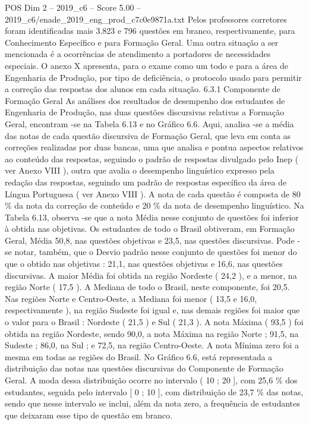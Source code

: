 \begin{textsample}{POS Dim 2 – 2019\_c6 – Score 5.00 – 2019\_c6/enade\_2019\_eng\_prod\_c7c0e9871a.txt}
Pelos professores corretores foram identificadas mais 3.823 e 796 questões em branco, respectivamente, para Conhecimento Específico e para Formação Geral.
Uma outra situação a ser mencionada é a ocorrências de atendimento a portadores de necessidades especiais.
O anexo X apresenta, para o exame como um todo e para a área de Engenharia de Produção, por tipo de deficiência, o protocolo usado para permitir a correção das respostas dos alunos em cada situação. 6.3.1 Componente de Formação Geral As análises dos resultados de desempenho dos estudantes de Engenharia de Produção, nas duas questões discursivas relativas a Formação Geral, encontram -se na Tabela 6.13 e no Gráfico 6.6.
Aqui, analisa -se a média das notas de cada questão discursiva de Formação Geral, que leva em conta as correções realizadas por duas bancas, uma que analisa e pontua aspectos relativos ao conteúdo das respostas, seguindo o padrão de respostas divulgado pelo Inep ( ver Anexo VIII ), outra que avalia o desempenho linguístico expresso pela redação das respostas, seguindo um padrão de respostas específico da área de Língua Portuguesa ( ver Anexo VIII ).
A nota de cada questão é composta de 80 \% da nota da correção de conteúdo e 20 \% da nota de desempenho linguístico.
Na Tabela 6.13, observa -se que a nota Média nesse conjunto de questões foi inferior à obtida nas objetivas.
Os estudantes de todo o Brasil obtiveram, em Formação Geral, Média 50,8, nas questões objetivas e 23,5, nas questões discursivas.
Pode -se notar, também, que o Desvio padrão nesse conjunto de questões foi menor do que o obtido nas objetivas : 21,1, nas questões objetivas e 16,6, nas questões discursivas.
A maior Média foi obtida na região Nordeste ( 24,2 ), e a menor, na região Norte ( 17,5 ).
A Mediana de todo o Brasil, neste componente, foi 20,5.
Nas regiões Norte e Centro-Oeste, a Mediana foi menor ( 13,5 e 16,0, respectivamente ), na região Sudeste foi igual e, nas demais regiões foi maior que o valor para o Brasil : Nordeste ( 21,5 ) e Sul ( 21,3 ).
A nota Máxima ( 93,5 ) foi obtida na região Nordeste, sendo 90,0, a nota Máxima na região Norte ; 91,5, na Sudeste ; 86,0, na Sul ; e 72,5, na região Centro-Oeste.
A nota Mínima zero foi a mesma em todas as regiões do Brasil.
No Gráfico 6.6, está representada a distribuição das notas nas questões discursivas do Componente de Formação Geral.
A moda dessa distribuição ocorre no intervalo ( 10 ; 20 ], com 25,6 \% dos estudantes, seguida pelo intervalo [ 0 ; 10 ], com distribuição de 23,7 \% das notas, sendo que nesse intervalo se inclui, além da nota zero, a frequência de estudantes que deixaram esse tipo de questão em branco.

\end{textsample}
